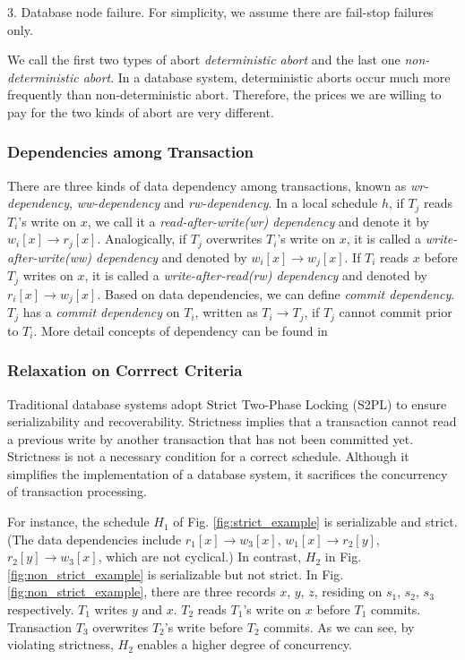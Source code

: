 \documentclass[conference]{IEEEtran}
\begin{document}
3. Database node failure. 
For simplicity, we assume there are fail-stop failures only.

We call the first two types of abort \emph{deterministic abort} and the last one \emph{non-deterministic abort}.
In a database system, deterministic aborts occur much more frequently than non-deterministic abort.
Therefore, the prices we are willing to pay for the two kinds of abort are very different. 

\subsubsection{Dependencies among Transaction}

There are three kinds of data dependency among transactions, known as 
\emph{wr-dependency}, 
\emph{ww-dependency} 
and \emph{rw-dependency}.
In a local schedule ${h}$, if ${T_j}$ reads ${T_i}$'s write on ${x}$,
we call it a \emph{read-after-write(wr) dependency} and denote it by ${w_i[x] \rightarrow r_j[x]}$.
Analogically, if ${T_j}$ overwrites ${T_i}$'s write on ${x}$, it is called a \emph{write-after-write(ww) dependency} and denoted by ${w_i[x] \rightarrow w_j[x]}$.
If ${T_i}$ reads ${x}$ before ${T_j}$ writes on ${x}$, it is called a \emph{write-after-read(rw) dependency} and denoted by ${r_i[x] \rightarrow w_j[x]}$.
Based on data dependencies, we can define \emph{commit dependency}. ${T_j}$ has a \emph{commit dependency} on ${T_i}$, written as ${T_i \rightarrow T_j}$, if ${T_j}$ cannot commit prior to ${T_i}$.
More detail concepts of dependency can be found in \cite{Dependency:conf/sigmod/ChrysanthisR90} \cite{Dependency:conf/sigmod/BilirisDGJR94}

\subsubsection{Relaxation on Corrrect Criteria}

Traditional database systems adopt Strict Two-Phase Locking (S2PL) \cite{DBLP:conf/vldb/Raz92} to ensure serializability and recoverability.
Strictness implies that a transaction cannot read a previous write by another transaction that has not been committed yet.
Strictness is not a necessary condition for a correct schedule.
Although it simplifies the implementation of a database system, it sacrifices the concurrency of transaction processing.

For instance, the schedule ${H_1}$ of Fig. \ref{fig:strict_example} is serializable and strict. 
(The data dependencies include ${r_1[x] \rightarrow w_3[x]}$, ${w_1[x] \rightarrow r_2[y]}$, ${r_2[y] \rightarrow w_3[x]}$, which are not cyclical.)
In contrast, ${H_2}$ in Fig. \ref{fig:non_strict_example} is serializable but not strict.
In Fig.    \ref{fig:non_strict_example}, there are three records ${x}$, ${y}$, ${z}$, residing on ${s_1}$, ${s_2}$, ${s_3}$ respectively.
${T_1}$ writes ${y}$ and ${x}$.
${T_2}$ reads ${T_1}$'s write on ${x}$ before ${T_1}$ commits.
Transaction ${T_3}$ overwrites ${T_2}$'s write before ${T_2}$ commits.
As we can see, by violating strictness, ${H_2}$  enables a higher degree of concurrency.
\end{document}

